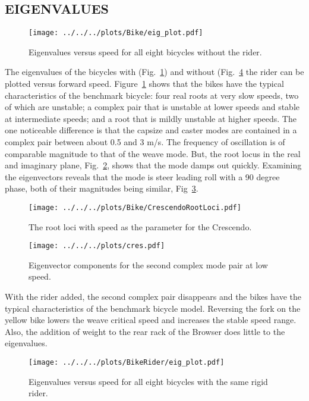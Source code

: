 \documentclass{bmd2010p}
\begin{document}
\subsection{EIGENVALUES}
\begin{figure}[tbp]
    \centering
    \texttt{[image: ../../../plots/Bike/eig\_plot.pdf]}
    \caption{Eigenvalues versus speed for all eight bicycles without the rider.}
    \label{fig:bikeEigPlot}
\end{figure}
The eigenvalues of the bicycles with (Fig.~\ref{fig:bikeEigPlot}) and without
(Fig.~\ref{fig:bikeRiderEigPlot} the rider can be plotted versus forward speed.
Figure~\ref{fig:bikeEigPlot} shows that the bikes have the typical
characteristics of the benchmark bicycle: four real roots at very slow
speeds, two of which are unstable; a complex pair that is unstable at lower
speeds and stable at intermediate speeds; and a root that is mildly unstable at
higher speeds. The one noticeable difference is that the capsize and caster
modes are contained in a complex pair between about 0.5 and 3 m/s. The frequency
of oscillation is of comparable magnitude to that of the weave mode. But, the root locus in the real
and imaginary plane, Fig.~\ref{fig:rootloci}, shows that the mode damps out
quickly. Examining the eigenvectors reveals that the mode is steer leading
roll with a 90 degree phase, both of their magnitudes being similar,
Fig~\ref{fig:evec}.
\begin{figure}[tb]
    \begin{center}
        \texttt{[image: ../../../plots/Bike/CrescendoRootLoci.pdf]}
    \end{center}
    \caption{The root loci with speed as the parameter for the Crescendo.}
    \label{fig:rootloci}
\end{figure}
\begin{figure}[tb]
    \begin{center}
        \texttt{[image: ../../../plots/cres.pdf]}
    \end{center}
    \caption{Eigenvector components for the second complex mode
    pair at low speed.}
    \label{fig:evec}
\end{figure}
With the rider added, the second complex pair disappears and the bikes have the
typical characteristics of the benchmark bicycle model. Reversing the fork on the yellow
bike lowers the weave critical speed and increases the stable speed range.
Also, the addition of weight to the rear rack of the Browser does little to the
eigenvalues.
\begin{figure}[tbp]
    \centering
    \texttt{[image: ../../../plots/BikeRider/eig\_plot.pdf]}
    \caption{Eigenvalues versus speed for all eight bicycles with the same
    rigid rider.}
    \label{fig:bikeRiderEigPlot}
\end{figure}
\end{document}
